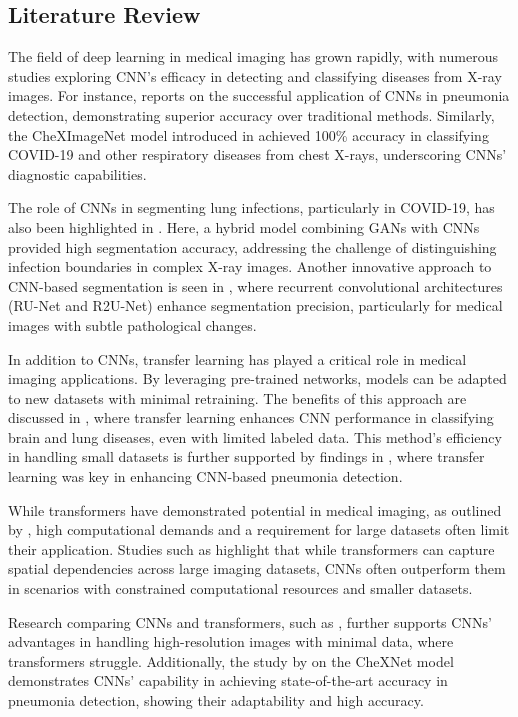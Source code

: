 \documentclass[10pt]{article}
\begin{document}
\subsection{Literature Review}
The field of deep learning in medical imaging has grown rapidly, with numerous studies exploring CNN's efficacy in detecting and classifying diseases from X-ray images. For instance, \cite{Sharma2023} reports on the successful application of CNNs in pneumonia detection, demonstrating superior accuracy over traditional methods. Similarly, the CheXImageNet model introduced in \cite{Shastri2022} achieved 100\% accuracy in classifying COVID-19 and other respiratory diseases from chest X-rays, underscoring CNNs' diagnostic capabilities.

The role of CNNs in segmenting lung infections, particularly in COVID-19, has also been highlighted in \cite{Negi2020}. Here, a hybrid model combining GANs with CNNs provided high segmentation accuracy, addressing the challenge of distinguishing infection boundaries in complex X-ray images. Another innovative approach to CNN-based segmentation is seen in \cite{Alom2018}, where recurrent convolutional architectures (RU-Net and R2U-Net) enhance segmentation precision, particularly for medical images with subtle pathological changes.

In addition to CNNs, transfer learning has played a critical role in medical imaging applications. By leveraging pre-trained networks, models can be adapted to new datasets with minimal retraining. The benefits of this approach are discussed in \cite{Salehi2023}, where transfer learning enhances CNN performance in classifying brain and lung diseases, even with limited labeled data. This method's efficiency in handling small datasets is further supported by findings in \cite{Manickam2021}, where transfer learning was key in enhancing CNN-based pneumonia detection.

While transformers have demonstrated potential in medical imaging, as outlined by \cite{Shamshad2022}, high computational demands and a requirement for large datasets often limit their application. Studies such as \cite{Singh2024} highlight that while transformers can capture spatial dependencies across large imaging datasets, CNNs often outperform them in scenarios with constrained computational resources and smaller datasets.

Research comparing CNNs and transformers, such as \cite{Gai2024}, further supports CNNs' advantages in handling high-resolution images with minimal data, where transformers struggle. Additionally, the study by \cite{Rajpurkar2017} on the CheXNet model demonstrates CNNs' capability in achieving state-of-the-art accuracy in pneumonia detection, showing their adaptability and high accuracy.
\end{document}
